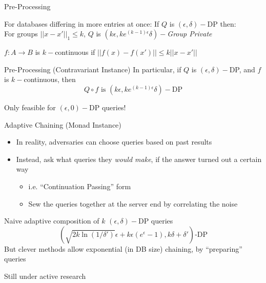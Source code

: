 \documentclass{beamer}
\newcommand{\epsdelt}{$(\epsilon,\delta)-$}
\begin{document}
\begin{frame}{Pre-Processing}
  \begin{definition}
    For databases differing in more entries at once:
    If $Q$ is \epsdelt DP then:\\
    For groups $||x-x'||_1 \leq k$, $Q$ is $(k\epsilon,ke^{(k-1)\epsilon}\delta)-${\it Group Private}
  \end{definition}
  \begin{definition}[$k-$continuous]
    $f: A \to B$ is $k-$continuous if $||f(x)-f(x')|| \leq k||x-x'||$
  \end{definition}
\begin{block}{Pre-Processing (Contravariant Instance)}
  In particular, if $Q$ is \epsdelt DP, and $f$ is $k-$continuous, then
  \[Q \circ f \mbox{ is } (k\epsilon,ke^{(k-1)\epsilon}\delta)-\mbox{DP}\]
\end{block}
\pause
\begin{block}{}
  \center \alert{Only feasible for $(\epsilon,0)-$DP queries!}
\end{block}
\end{frame}




\begin{frame}{Adaptive Chaining (Monad Instance)}
  \begin{itemize}
    \item In reality, adversaries can choose queries based on past results
    \item Instead, ask what queries they {\it would make}, if the answer turned out a certain way \begin{itemize}
      \item i.e. ``Continuation Passing'' form
      \item Sew the queries together at the server end by correlating the noise
    \end{itemize}
  \end{itemize}
  \begin{block}{Naive adaptive composition of $k$ \epsdelt DP queries}
    \[(\sqrt{2k\ln{(1/\delta')}} \epsilon + k \epsilon(e^{\epsilon}-1),k\delta + \delta')\mbox{-DP}\]
    But clever methods allow exponential (in DB size) chaining, by ``preparing'' queries
  \end{block}
  \pause
  \begin{block}{}
    \center    \alert{Still under active research}

  \end{block}

\end{frame}
\end{document}
